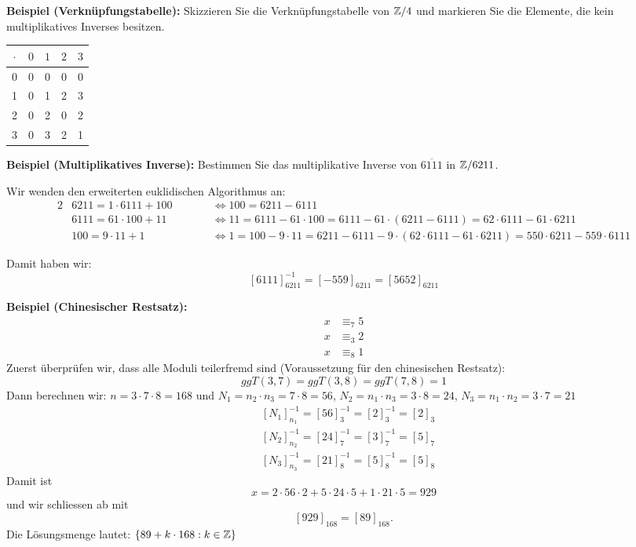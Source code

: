 \textbf{Beispiel (Verknüpfungstabelle):} Skizzieren Sie die Verknüpfungstabelle von $\mathbb{Z}/4$ und markieren Sie die Elemente, die kein multiplikatives Inverses besitzen.

\begin{center}
    \begin{tabular}{c|cccc}
        $\cdot$ & $0$ & $1$ & $2$ & $3$ \\
        \hline
        0       & 0   & 0   & 0   & 0   \\
        1       & 0   & 1   & 2   & 3   \\
        2       & 0   & 2   & 0   & 2   \\
        3       & 0   & 3   & 2   & 1
    \end{tabular}
\end{center}

\textbf{Beispiel (Multiplikatives Inverse):} Bestimmen Sie das multiplikative Inverse von $\overline{6111}$ in $\mathbb{Z}/6211$.

Wir wenden den erweiterten euklidischen Algorithmus an:
\begin{alignat*}{2}
    &6211 = 1 \cdot 6111 + 100 \quad \quad &&\Leftrightarrow 100 = 6211 - 6111 \\
    &6111 = 61 \cdot 100 + 11 &&\Leftrightarrow 11 = 6111 - 61 \cdot 100 = 6111 - 61 \cdot (6211 - 6111) = 62 \cdot 6111 - 61 \cdot 6211 \\
    &100 = 9 \cdot 11 + 1 &&\Leftrightarrow 1 = 100 - 9 \cdot 11 = 6211 - 6111 - 9 \cdot (62 \cdot 6111 - 61 \cdot 6211) = 550 \cdot 6211 - 559 \cdot 6111
\end{alignat*}

Damit haben wir: \[[6111]_{6211}^{-1} = [-559]_{6211} = [5652]_{6211}\]

\textbf{Beispiel (Chinesischer Restsatz):}
\begin{align*}
    x &\equiv_{7} 5 \\
    x &\equiv_{3} 2 \\
    x &\equiv_{8} 1
\end{align*}
Zuerst überprüfen wir, dass alle Moduli teilerfremd sind (Voraussetzung für den chinesischen Restsatz): \[ggT(3,7) = ggT(3,8) = ggT(7,8) = 1\]
Dann berechnen wir: $n = 3 \cdot 7 \cdot 8 = 168$ und $N_1 = n_2 \cdot n_3 = 7 \cdot 8 = 56$, $N_2 = n_1 \cdot n_3 = 3 \cdot 8 = 24$, $N_3 = n_1 \cdot n_2 = 3 \cdot 7 = 21$
\begin{align*}
    &[N_1]_{n_1}^{-1} = [56]_3^{-1} = [2]_3^{-1} = [2]_3 \\
    &[N_2]_{n_2}^{-1} = [24]_7^{-1} = [3]_7^{-1} = [5]_7 \\
    &[N_3]_{n_3}^{-1} = [21]_8^{-1} = [5]_8^{-1} = [5]_8
\end{align*}
Damit ist \[x = 2 \cdot 56 \cdot 2 + 5 \cdot 24 \cdot 5 + 1 \cdot 21 \cdot 5 = 929\] und wir schliessen ab mit \[[929]_{168} = [89]_{168}.\]
Die Lösungsmenge lautet: $\{89 + k \cdot 168 : k \in \mathbb{Z}\}$